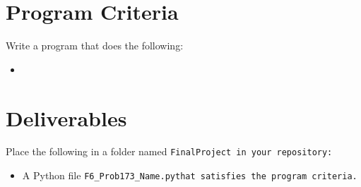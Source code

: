 \documentclass{article}
\def\prog#1{
\vspace{.1in}\begin{mdframed} \begin{center} \textbf{Programming Reminders} \end{center}#1 \end{mdframed} }
\newcommand\foldername{\tt{FinalProject} }
\newcommand\filename{\tt{F6\_Prob173\_Name.py}\;\;}
\begin{document}
	
	
 
 	
 	
 	
 	
 	
 	
 	

	
	
	
	
	
	
	
	




\section*{Program Criteria}
	Write a program that does the following:
	\begin{itemize}
		\item
	\end{itemize}







\section*{Deliverables}
	
	
	Place the following in a folder named \foldername in your repository:
	\begin{itemize}
		\item A Python file \filename  that satisfies the program criteria.
	\end{itemize}

	
\end{document}
